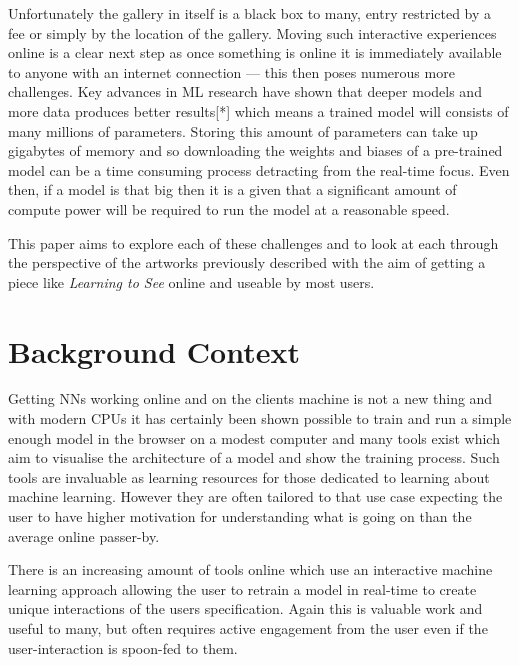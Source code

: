 \documentclass[a4paper]{article}
\begin{document}
Unfortunately the gallery in itself is a black box to many, entry restricted by a fee or simply by the location of the gallery. Moving such interactive experiences online is a clear next step as once something is online it is immediately available to anyone with an internet connection --- this then poses numerous more challenges. Key advances in ML research have shown that deeper models and more data produces better results[*] which means a trained model will consists of many millions of parameters. Storing this amount of parameters can take up gigabytes of memory and so downloading the weights and biases of a pre-trained model can be a time consuming process detracting from the real-time focus. Even then, if a model is that big then it is a given that a significant amount of compute power will be required to run the model at a reasonable speed.

This paper aims to explore each of these challenges and to look at each through the perspective of the artworks previously described with the aim of getting a piece like \textit{Learning to See} online and useable by most users.


\section{Background Context}

Getting NNs working online and on the clients machine is not a new thing and with modern CPUs it has certainly been shown possible to train and run a simple enough model in the browser on a modest computer\cite{karparthy_conjs_2016, brainjs, synaptic, mind, kerasjs} and many tools exist which aim to visualise the architecture of a model and show the training process\cite{broad_cnn_vis_2016, tensorflow_playground, 1704.01942}. Such tools are invaluable as learning resources for those dedicated to learning about machine learning. However they are often tailored to that use case expecting the user to have higher motivation for understanding what is going on than the average online passer-by.

There is an increasing amount of tools online which use an interactive machine learning approach allowing the user to retrain a model in real-time to create unique interactions of the users specification\cite{magenta, mimic, teachablemachines}. Again this is valuable work and useful to many, but often requires active engagement from the user even if the user-interaction is spoon-fed to them.
\end{document}
